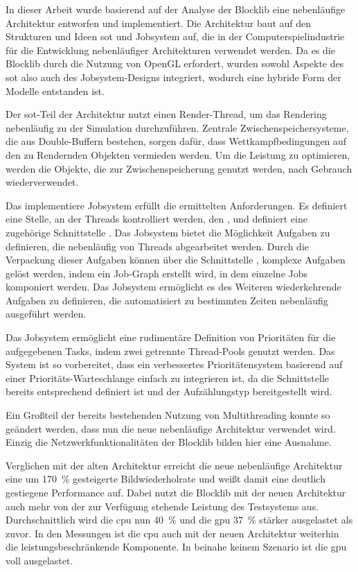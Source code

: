 In dieser Arbeit wurde basierend auf der Analyse der Blocklib eine nebenläufige Architektur entworfen und implementiert. Die Architektur baut auf den Strukturen und Ideen \acf{sot} und Jobsystem auf, die in der Computerspielindustrie für die Entwicklung nebenläufiger Architekturen verwendet werden. Da es die Blocklib durch die Nutzung von OpenGL erfordert, wurden sowohl Aspekte des \ac{sot} also auch des Jobsystem-Designs integriert, wodurch eine hybride Form der Modelle entstanden ist.

Der \ac{sot}-Teil der Architektur nutzt einen Render-Thread, um das Rendering nebenläufig zu der Simulation durchzuführen. Zentrale Zwischenspeichersysteme, die aus Double-Buffern bestehen, sorgen dafür, dass Wettkampfbedingungen auf den zu Rendernden Objekten vermieden werden. Um die Leistung zu optimieren, werden die Objekte, die zur Zwischenspeicherung genutzt werden, nach Gebrauch wiederverwendet.

Das implementiere Jobsystem erfüllt die ermittelten Anforderungen. Es definiert eine Stelle, an der Threads kontrolliert werden, den , und definiert eine zugehörige Schnittstelle . Das Jobsystem bietet die Möglichkeit Aufgaben zu definieren, die nebenläufig von Threads abgearbeitet werden. Durch die Verpackung dieser Aufgaben können über die Schnittstelle , komplexe Aufgaben gelöst werden, indem ein Job-Graph erstellt wird, in dem einzelne Jobs komponiert werden. Das Jobsystem ermöglicht es des Weiteren wiederkehrende Aufgaben zu definieren, die automatisiert zu bestimmten Zeiten nebenläufig ausgeführt werden.

Das Jobsystem ermöglicht eine rudimentäre Definition von Prioritäten für die aufgegebenen Tasks, indem zwei getrennte Thread-Pools genutzt werden. Das System ist so vorbereitet, dass ein verbessertes Prioritätensystem basierend auf einer Prioritäts-Warteschlange einfach zu integrieren ist, da die Schnittstelle  bereits entsprechend definiert ist und der Aufzählungstyp  bereitgestellt wird.

Ein Großteil der bereits bestehenden Nutzung von Multithreading konnte so geändert werden, dass nun die neue nebenläufige Architektur verwendet wird. Einzig die Netzwerkfunktionalitäten der Blocklib bilden hier eine Ausnahme.

Verglichen mit der alten Architektur erreicht die neue nebenläufige Architektur eine um \SI{170}{\percent} gesteigerte Bildwiederholrate und weißt damit eine deutlich gestiegene Performance auf. Dabei nutzt die Blocklib mit der neuen Architektur auch mehr von der zur Verfügung stehende Leistung des Testsystems aus. Durchschnittlich wird die \ac{cpu} nun \SI{40}{\percent} und die \ac{gpu} \SI{37}{\percent} stärker ausgelastet als zuvor. In den Messungen ist die \ac{cpu} auch mit der neuen Architektur weiterhin die leistungsbeschränkende Komponente. In beinahe keinem Szenario ist die \ac{gpu} voll ausgelastet.